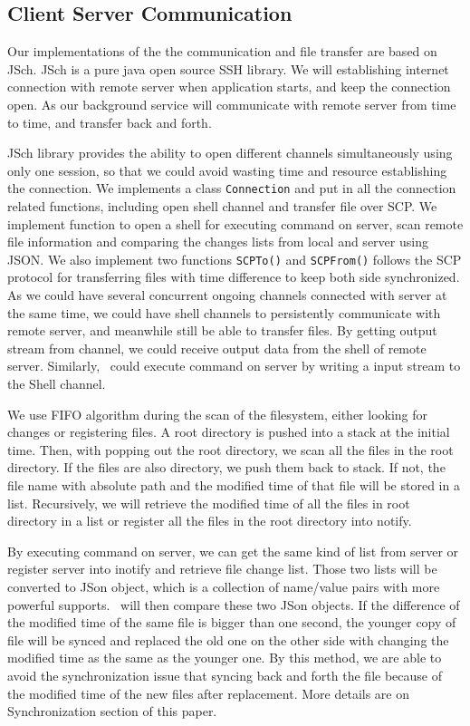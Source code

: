 \subsection{Client Server Communication}
Our implementations of the the communication and file transfer are based on JSch. JSch is a pure java open source SSH library. We will establishing internet connection with remote server when application starts, and keep the connection open. As our background service will communicate with remote server from time to time, and transfer back and forth. 

JSch library provides the ability to open different channels simultaneously using only one session, so that we could avoid 
wasting time and resource establishing the connection. We implements a class \verb+Connection+ and put in all the 
connection related functions, including open shell channel and transfer file over SCP. We implement function to open 
a shell for executing command on server, scan remote file information and comparing the changes lists from local and server 
using JSON. We also implement two functions \verb+SCPTo()+ and \verb+SCPFrom()+ follows the SCP protocol for transferring files with time 
difference to keep both side synchronized. As we could have several concurrent ongoing channels connected with server at 
the same time, we could have shell channels to persistently communicate with remote server, and meanwhile still be able 
to transfer files. By getting output stream from channel, we could receive output data from the shell of remote server. 
Similarly, \teledroid\ could execute command on server by writing a input stream to the Shell channel. 

We use FIFO algorithm during the scan of the filesystem, either looking for changes or registering files. A root directory is pushed into a stack at the initial time. Then, with popping out the root directory, we scan all the files in the root directory. If the files are also directory, we push them back to stack. If not, the file name with absolute path and the modified time of that file will be stored in a list. Recursively, we will retrieve the modified time of all the files in root directory in a list or register all the files in the root directory into notify. 

By executing command on server, we can get the same kind of list from server or register server into inotify and retrieve file change list. Those two lists will be converted to JSon object, which is a collection of name/value pairs with more powerful supports. \teledroid\ will then compare these two JSon objects. If the difference of the modified time of the same file is bigger than one second, the younger copy of file will be synced and replaced the old one on the other side with changing the modified time as the same as the younger one. By this method, we are able to avoid the synchronization issue that syncing back and forth the file because of the modified time of the new files after replacement. More details are on Synchronization section of this paper.

